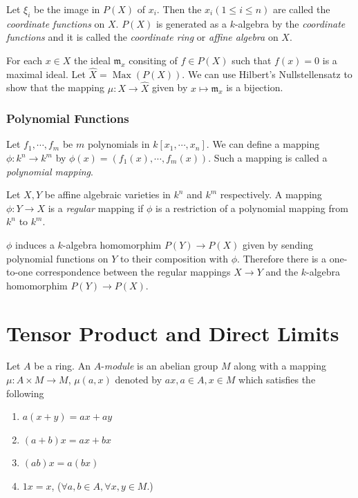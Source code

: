 \documentclass[]{report}
\DeclareMathOperator\Max{Max}
\begin{document}
    Let $\xi_i$ be the image in $P(X)$ of $x_i$. Then the $x_i (1\leq i\leq n)$ are called the \textit{coordinate functions} on $X$. $P(X)$ is generated as a $k$-algebra by the \textit{coordinate functions} and it is called the \textit{coordinate ring} or \textit{affine algebra} on $X$.

    For each $x\in X$ the ideal $\mathfrak{m}_x$ consiting of $f\in P(X)$ such that $f(x) = 0$ is a maximal ideal. Let $\hat{X} = \Max(P(X))$. We can use Hilbert's Nullstellensatz to show that the mapping $\mu: X \rightarrow \hat{X}$ given by $x\mapsto \mathfrak{m}_x$ is a bijection.

\subsection{Polynomial Functions}

Let $f_1,\cdots, f_m$ be $m$ polynomials in $k[x_1,\cdots,x_n]$. We can define a mapping $\phi: k^n\rightarrow k^m$ by $\phi(x) = (f_1(x),\cdots,f_m(x))$. Such a mapping is called a \textit{polynomial mapping}.

    Let $X,Y$ be affine algebraic varieties in $k^n$ and $k^m$ respectively. A mapping $\phi: Y\rightarrow X$ is a \textit{regular} mapping if $\phi$ is a restriction of a polynomial mapping from $k^n$ to $k^m$.

    $\phi$ induces a $k$-algebra homomorphim $P(Y) \rightarrow P(X)$ given by sending polynomial functions on $Y$ to their composition with $\phi$. Therefore there is a one-to-one correspondence between the regular mappings $X\rightarrow Y$ and the $k$-algebra homomorphim $P(Y) \rightarrow P(X)$.


\chapter{Tensor Product and Direct Limits}

Let $A$ be a ring. An $A$-\textit{module} is an abelian group $M$ along with a mapping $\mu: A\times M\rightarrow M$, $\mu(a,x)$ denoted by $ax, a\in A, x\in M$ which satisfies the following
\begin{enumerate}
    \item $a(x+y) = ax + ay$
    \item $(a+b)x = ax + bx$
    \item $(ab)x = a(bx)$
    \item $1x = x$, 
 ($\forall a,b \in A, \forall x,y \in M$.)
\end{enumerate}
\end{document}

